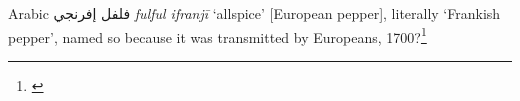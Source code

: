 \begin{etymology}\label{ety:fulful ifranji}
Arabic {فلفل إفرنجي} \textit{fulful ifranjī} `allspice' [European pepper], literally `Frankish pepper', named so because it was transmitted by Europeans, 1700?\footnote{\textcite{baalbaki_-mawrid_1995}}
\end{etymology}